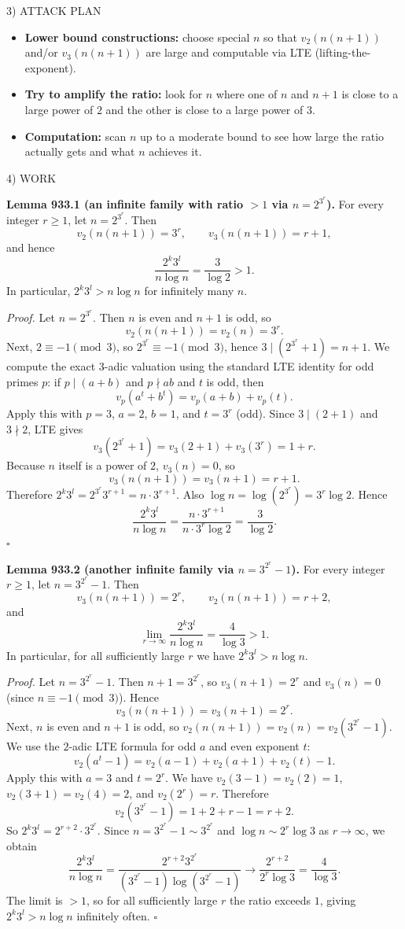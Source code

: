 3) ATTACK PLAN

\begin{itemize}
\item \textbf{Lower bound constructions:} choose special $n$ so that $v_2(n(n+1))$ and/or $v_3(n(n+1))$ are large and computable via LTE (lifting-the-exponent).
\item \textbf{Try to amplify the ratio:} look for $n$ where one of $n$ and $n+1$ is close to a large power of $2$ and the other is close to a large power of $3$.
\item \textbf{Computation:} scan $n$ up to a moderate bound to see how large the ratio actually gets and what $n$ achieves it.
\end{itemize}

4) WORK

\textbf{Lemma 933.1 (an infinite family with ratio $>1$ via $n=2^{3^r}$).}
For every integer $r\ge 1$, let $n=2^{3^r}$. Then
\[
 v_2(n(n+1))=3^r,\qquad v_3(n(n+1))=r+1,
\]
and hence
\[
\frac{2^k3^l}{n\log n}=\frac{3}{\log 2}>1.
\]
In particular, $2^k3^l>n\log n$ for infinitely many $n$.

\emph{Proof.}
Let $n=2^{3^r}$. Then $n$ is even and $n+1$ is odd, so
\[
v_2(n(n+1))=v_2(n)=3^r.
\]
Next, $2\equiv -1\pmod 3$, so $2^{3^r}\equiv -1\pmod 3$, hence $3\mid (2^{3^r}+1)=n+1$.
We compute the exact 3-adic valuation using the standard LTE identity for odd primes $p$:
if $p\mid (a+b)$ and $p\nmid ab$ and $t$ is odd, then
\[
 v_p(a^t+b^t)=v_p(a+b)+v_p(t).
\]
Apply this with $p=3$, $a=2$, $b=1$, and $t=3^r$ (odd).
Since $3\mid (2+1)$ and $3\nmid 2$, LTE gives
\[
 v_3(2^{3^r}+1)=v_3(2+1)+v_3(3^r)=1+r.
\]
Because $n$ itself is a power of $2$, $v_3(n)=0$, so
\[
 v_3(n(n+1))=v_3(n+1)=r+1.
\]
Therefore $2^k3^l=2^{3^r}3^{r+1}=n\cdot 3^{r+1}$.
Also $\log n = \log(2^{3^r})=3^r\log 2$.
Hence
\[
\frac{2^k3^l}{n\log n}=\frac{n\cdot 3^{r+1}}{n\cdot 3^r\log 2}=\frac{3}{\log 2}.
\]
\hfill$\square$

\medskip
\textbf{Lemma 933.2 (another infinite family via $n=3^{2^r}-1$).}
For every integer $r\ge 1$, let $n=3^{2^r}-1$. Then
\[
 v_3(n(n+1))=2^r,\qquad v_2(n(n+1))=r+2,
\]
and
\[
\lim_{r\to\infty}\frac{2^k3^l}{n\log n}=\frac{4}{\log 3}>1.
\]
In particular, for all sufficiently large $r$ we have $2^k3^l>n\log n$.

\emph{Proof.}
Let $n=3^{2^r}-1$. Then $n+1=3^{2^r}$, so $v_3(n+1)=2^r$ and $v_3(n)=0$ (since $n\equiv -1\pmod 3$). Hence
\[
v_3(n(n+1))=v_3(n+1)=2^r.
\]
Next, $n$ is even and $n+1$ is odd, so $v_2(n(n+1))=v_2(n)=v_2(3^{2^r}-1)$.
We use the $2$-adic LTE formula for odd $a$ and even exponent $t$:
\[
 v_2(a^t-1)=v_2(a-1)+v_2(a+1)+v_2(t)-1.
\]
Apply this with $a=3$ and $t=2^r$.
We have $v_2(3-1)=v_2(2)=1$, $v_2(3+1)=v_2(4)=2$, and $v_2(2^r)=r$.
Therefore
\[
 v_2(3^{2^r}-1)=1+2+r-1=r+2.
\]
So $2^k3^l=2^{r+2}\cdot 3^{2^r}$.
Since $n=3^{2^r}-1\sim 3^{2^r}$ and $\log n\sim 2^r\log 3$ as $r\to\infty$, we obtain
\[
\frac{2^k3^l}{n\log n}
=\frac{2^{r+2}3^{2^r}}{(3^{2^r}-1)\log(3^{2^r}-1)}
\longrightarrow \frac{2^{r+2}}{2^r\log 3}=\frac{4}{\log 3}.
\]
The limit is $>1$, so for all sufficiently large $r$ the ratio exceeds $1$, giving $2^k3^l>n\log n$ infinitely often.
\hfill$\square$

